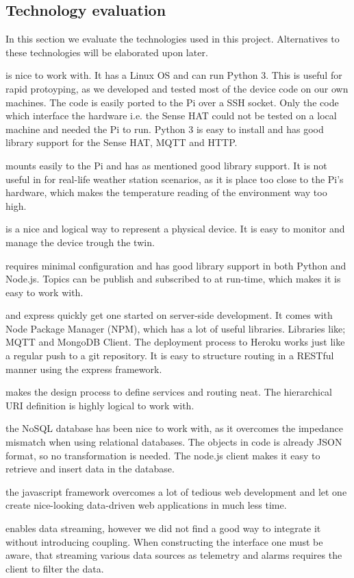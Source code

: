 \subsection*{Technology evaluation}
In this section we evaluate the technologies used in this project. Alternatives to these technologies will be elaborated upon later.
\begin{description}[style=unboxed,leftmargin=0cm]
    \item[Raspberry Pi] is nice to work with. It has a Linux OS and can run Python 3. This is useful for rapid protoyping, as we developed and tested most of the device code on our own machines. The code is easily ported to the Pi over a SSH socket. Only the code which interface the hardware i.e. the Sense HAT could not be tested on a local machine and needed the Pi to run. Python 3 is easy to install and has good library support for the Sense HAT, MQTT and HTTP.
    \item[Sense HAT] mounts easily to the Pi and has as mentioned good library support. It is not useful in for real-life weather station scenarios, as it is place too close to the Pi's hardware, which makes the temperature reading of the environment way too high.
    \item[Device Twin] is a nice and logical way to represent a physical device. It is easy to monitor and manage the device trough the twin.  
    \item[MQTT] requires minimal configuration and has good library support in both Python and Node.js. Topics can be publish and subscribed to at run-time, which makes it is easy to work with. 
    \item[Node.js] and express quickly get one started on server-side development. It comes with Node Package Manager (NPM), which has a lot of useful libraries. Libraries like; MQTT and MongoDB Client. The deployment process to Heroku works just like a regular push to a git repository. It is easy to structure routing in a RESTful manner using the express framework.
    \item[REST] makes the design process to define services and routing neat. The hierarchical URI definition is highly logical to work with.  
    \item[MongoDB] the NoSQL database has been nice to work with, as it overcomes the impedance mismatch when using relational databases. The objects in code is already JSON format, so no transformation is needed. The node.js client makes it easy to retrieve and insert data in the database.   
    \item[Angular] the javascript framework overcomes a lot of tedious web development and let one create nice-looking data-driven web applications in much less time.
    \item[SSE] enables data streaming, however we did not find a good way to integrate it without introducing coupling. When constructing the interface one must be aware, that streaming various data sources as telemetry and alarms requires the client to filter the data.
\end{description}